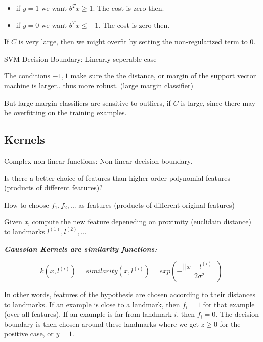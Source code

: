 \documentclass{article}
\begin{document}
\begin{itemize}
    \item if $y = 1$ we want $\theta^T x \geq 1$. The cost is zero then.
    \item if $y=0$ we want $\theta^T x \leq -1$. The cost is zero then.
\end{itemize}


If $C$ is very large, then we might overfit by setting the non-regularized term to 0.

SVM Decision Boundary: Linearly seperable case

The conditions $-1, 1$ make sure the the distance, or margin of the support vector machine is larger.. thus more robust. (large margin classifier)

But large margin classifiers are sensitive to outliers, if $C$ is large, since there may be overfitting on the training examples. 




\subsection{Kernels}


Complex non-linear functions: Non-linear decision boundary.


Is there a better choice of features than higher order polynomial features (products of different features)?

How to choose $f_1, f_2, ...$ as features (products of different original features)


Given \textit{x}, compute the new feature depeneding on proximity (euclidain distance) to landmarks $l^{(1)}, l^{(2)}, ...$

\hspace{}

\textit{\textbf{{Gaussian Kernels are similarity functions:}}}

\begin{equation}
    k(x, l^{(i)}) = similarity (x , l^{(i)} ) = exp \left( -\frac{ \vert \vert x - l^{(i)} \vert \vert}{2 \sigma^2} \right)
\end{equation}

In other words, features of the hypothesis are chosen according to their distances to landmarks. If an example is close to a landmark, then $f_i = 1$ for that example (over all features). If an example is far from landmark $i$, then $f_i = 0$. The decision boundary is then chosen around these landmarks where we get $z \geq 0$ for the positive case, or $y=1$.
\end{document}
